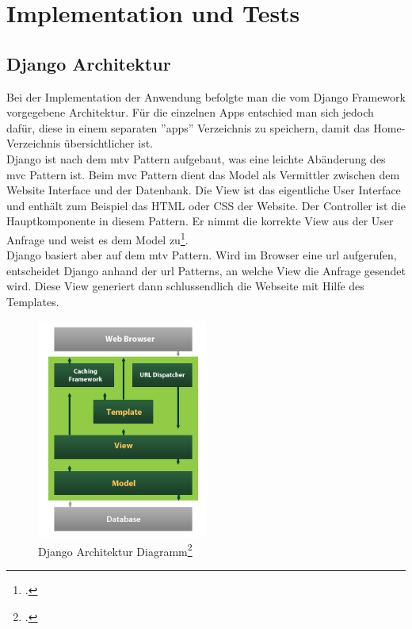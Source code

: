 \section{Implementation und Tests}
\subsection{Django Architektur}
Bei der Implementation der Anwendung befolgte man die vom Django Framework vorgegebene Architektur. Für die einzelnen Apps entschied man sich jedoch dafür, diese in einem separaten ''apps'' Verzeichnis zu speichern, damit das Home-Verzeichnis übersichtlicher ist.\\

Django ist nach dem \gls{mtv} Pattern aufgebaut, was eine leichte Abänderung des \gls{mvc} Pattern ist. Beim \gls{mvc} Pattern dient das Model als Vermittler zwischen dem Website Interface und der Datenbank. Die View ist das eigentliche User Interface und enthält zum Beispiel das HTML oder CSS der Website. Der Controller ist die Hauptkomponente in diesem Pattern. Er nimmt die korrekte View aus der User Anfrage und weist es dem Model zu\footcite{django_mvc}. \\

Django basiert aber auf dem \gls{mtv} Pattern. Wird im Browser eine \gls{url} aufgerufen, entscheidet Django anhand der \gls{url} Patterns, an welche View die Anfrage gesendet wird. Diese View generiert dann schlussendlich die Webseite mit Hilfe des Templates. \\


\begin{figure}[H]
	\begin{center}	
		\includegraphics[width=0.5\textwidth, keepaspectratio]{images/django_mtv.png}
		\caption{Django Architektur Diagramm\footcite{django_architektur_image}}
			\label{django_architecture}
	\end{center}
\end{figure}

